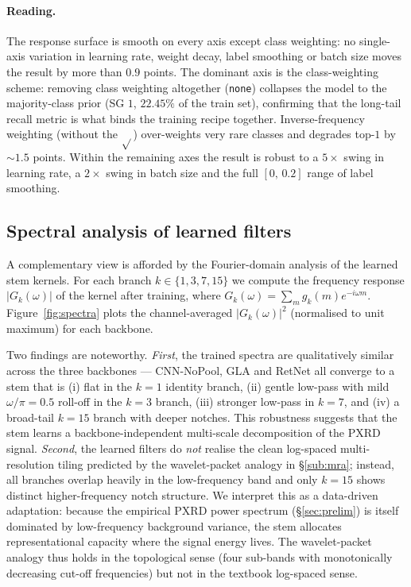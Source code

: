 \documentclass[final]{ws-ijwmip}
\begin{document}
\paragraph{Reading.}
The response surface is smooth on every axis except class weighting:
no single-axis variation in learning rate, weight decay, label
smoothing or batch size moves the result by more than $0.9$ points.
The dominant axis is the class-weighting scheme: removing
class weighting altogether (\texttt{none}) collapses the model to the
majority-class prior (SG $1$, $22.45\%$ of the train set), confirming
that the long-tail recall metric is what binds the training recipe together.
Inverse-frequency weighting (without the $\sqrt{}$) over-weights very
rare classes and degrades top-$1$ by $\sim 1.5$ points. Within the
remaining axes the result is robust to a $5\times$ swing in learning
rate, a $2\times$ swing in batch size and the full $[0,\,0.2]$ range
of label smoothing.


\subsection{Spectral analysis of learned filters}

\label{sub:spectral}

A complementary view is afforded by the Fourier-domain analysis of the
learned stem kernels. For each branch $k\in\{1,3,7,15\}$ we compute the
frequency response $|G_k(\omega)|$ of the kernel after training, where
$G_k(\omega) = \sum_m g_k(m) e^{-i\omega m}$. Figure~\ref{fig:spectra}
plots the channel-averaged $|G_k(\omega)|^2$ (normalised to unit
maximum) for each backbone.

Two findings are noteworthy. \emph{First}, the trained spectra are
qualitatively similar across the three backbones — CNN-NoPool, GLA and
RetNet all converge to a stem that is (i) flat in the $k=1$ identity
branch, (ii) gentle low-pass with mild $\omega/\pi=0.5$ roll-off in the
$k=3$ branch, (iii) stronger low-pass in $k=7$, and (iv) a
broad-tail $k=15$ branch with deeper notches. This robustness suggests
that the stem learns a backbone-independent multi-scale decomposition
of the PXRD signal. \emph{Second}, the learned filters do \emph{not}
realise the clean log-spaced multi-resolution tiling predicted by the
wavelet-packet analogy in \S\ref{sub:mra}; instead, all branches
overlap heavily in the low-frequency band and only $k=15$ shows
distinct higher-frequency notch structure. We interpret this as a
data-driven adaptation: because the empirical PXRD power spectrum
(\S\ref{sec:prelim}) is itself dominated by low-frequency
background variance, the stem allocates representational capacity
where the signal energy lives. The wavelet-packet analogy thus holds
in the topological sense (four sub-bands with monotonically decreasing
cut-off frequencies) but not in the textbook log-spaced sense.
\end{document}

